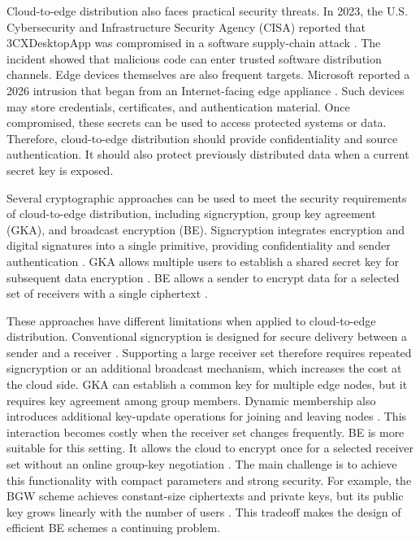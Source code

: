 \documentclass[sigconf,anonymous]{acmart}
\theoremstyle{definition}
\theoremstyle{definition}
\theoremstyle{definition}
\theoremstyle{definition}
\theoremstyle{definition}
\theoremstyle{definition}
\theoremstyle{definition}
\theoremstyle{definition}
\theoremstyle{definition}
\begin{document}
Cloud-to-edge distribution also faces practical security threats. In 2023, the U.S. Cybersecurity and Infrastructure Security Agency (CISA) reported that 3CXDesktopApp was compromised in a software supply-chain attack \cite{CISA3CX2023}. The incident showed that malicious code can enter trusted software distribution channels. Edge devices themselves are also frequent targets. Microsoft reported a 2026 intrusion that began from an Internet-facing edge appliance \cite{MicrosoftEdge2026}. Such devices may store credentials, certificates, and authentication material. Once compromised, these secrets can be used to access protected systems or data. Therefore, cloud-to-edge distribution should provide confidentiality and source authentication. It should also protect previously distributed data when a current secret key is exposed.

Several cryptographic approaches can be used to meet the security requirements of cloud-to-edge distribution, including signcryption, group key agreement (GKA), and broadcast encryption (BE). Signcryption integrates encryption and digital signatures into a single primitive, providing confidentiality and sender authentication \cite{Zheng1997}. GKA allows multiple users to establish a shared secret key for subsequent data encryption \cite{Ingemarsson1982}. BE allows a sender to encrypt data for a selected set of receivers with a single ciphertext \cite{FiatNaor1993}.

These approaches have different limitations when applied to cloud-to-edge distribution. Conventional signcryption is designed for secure delivery between a sender and a receiver \cite{Zheng1997}. Supporting a large receiver set therefore requires repeated signcryption or an additional broadcast mechanism, which increases the cost at the cloud side. GKA can establish a common key for multiple edge nodes, but it requires key agreement among group members. Dynamic membership also introduces additional key-update operations for joining and leaving nodes \cite{Steiner2000}. This interaction becomes costly when the receiver set changes frequently. BE is more suitable for this setting. It allows the cloud to encrypt once for a selected receiver set without an online group-key negotiation \cite{FiatNaor1993}. The main challenge is to achieve this functionality with compact parameters and strong security. For example, the BGW scheme achieves constant-size ciphertexts and private keys, but its public key grows linearly with the number of users \cite{BGW05}. This tradeoff makes the design of efficient BE schemes a continuing problem.
\end{document}
